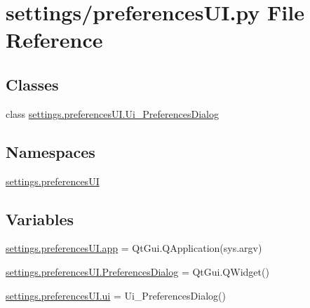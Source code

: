 \hypertarget{a00032}{}\section{settings/preferences\+UI.py File Reference}
\label{a00032}
\subsection*{Classes}
\begin{DoxyCompactItemize}
\item 
class \hyperlink{a00106}{settings.\+preferences\+U\+I.\+Ui\+\_\+\+Preferences\+Dialog}
\end{DoxyCompactItemize}
\subsection*{Namespaces}
\begin{DoxyCompactItemize}
\item 
 \hyperlink{a00060}{settings.\+preferences\+UI}
\end{DoxyCompactItemize}
\subsection*{Variables}
\begin{DoxyCompactItemize}
\item 
\hyperlink{a00060_a827bf1bd672334a2a55713a2a33e610d}{settings.\+preferences\+U\+I.\+app} = Qt\+Gui.\+Q\+Application(sys.\+argv)
\item 
\hyperlink{a00060_a70162ca377a00273f0795162093f7958}{settings.\+preferences\+U\+I.\+Preferences\+Dialog} = Qt\+Gui.\+Q\+Widget()
\item 
\hyperlink{a00060_ae448bdbd0fb6bba061e4735237500ea5}{settings.\+preferences\+U\+I.\+ui} = Ui\+\_\+\+Preferences\+Dialog()
\end{DoxyCompactItemize}
